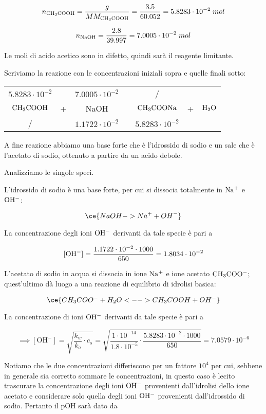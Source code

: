 $$n_{\rm CH_3COOH}=\frac{g}{MM_{\rm CH_3COOH}}=\frac{3.5}{60.052}=5.8283 \cdot 10^{-2}\;mol$$

$$n_{\rm NaOH}=\frac{2.8}{39.997}=7.0005 \cdot 10^{-2}\;mol$$

Le moli di acido acetico sono in difetto, quindi sarà il reagente limitante.

Scriviamo la reazione con le concentrazioni iniziali sopra e quelle finali sotto:

\begin{center}
    \begin{tabular}{ccccccc}
        $5.8283 \cdot 10^{-2}$ &  & $7.0005 \cdot 10^{-2}$ & & / &&\\
        $\rm CH_3COOH$ & + & NaOH & \ce{->} & $\rm CH_3COONa$ & + & $\rm H_2O$\\
        / & & $1.1722 \cdot 10^{-2}$ & & $5.8283 \cdot 10^{-2}$&&\\
    \end{tabular}
\end{center}

A fine reazione abbiamo una base forte che è l'idrossido di sodio e un sale che è l'acetato di sodio, ottenuto a partire da un acido debole.

Analizziamo le singole speci.

L'idrossido di sodio è una base forte, per cui si dissocia totalmente in $\rm Na^+$ e $\rm OH^-$:

$$\ce{NaOH -> Na^+ + OH^-}$$

La concentrazione degli ioni $\rm OH^-$ derivanti da tale specie è pari a

$$[\rm OH^-]=\frac{1.1722 \cdot 10^{-2} \cdot 1000}{650}=1.8034 \cdot 10^{-2}$$

L'acetato di sodio in acqua si dissocia in ione $\rm Na^+$ e ione acetato $\rm CH_3COO^-$; quest'ultimo dà luogo a una reazione di equilibrio di idrolisi basica:

$$\ce{CH_3COO^- + H_2O <--> CH_3COOH + OH^-}$$

La concentrazione di ioni $\rm OH^-$ derivanti da tale specie è pari a

$$\implies [\text{OH}^-]=\sqrt{\frac{k_w}{k_a} \cdot c_s}=\sqrt{\frac{1 \cdot 10^{-14}}{1.8 \cdot 10^{-5}} \cdot \frac{5.8283 \cdot 10^{-2} \cdot 1000}{650}}=7.0579 \cdot 10^{-6}$$

Notiamo che le due concentrazioni differiscono per un fattore $10^4$ per cui, sebbene in generale sia corretto sommare le concentrazioni, in questo caso è lecito trascurare la concentrazione degli ioni $\rm OH^-$ provenienti dall'idrolisi dello ione acetato e considerare solo quella degli ioni $\rm OH^-$ provenienti dall'idrossido di sodio. Pertanto il pOH sarà dato da

